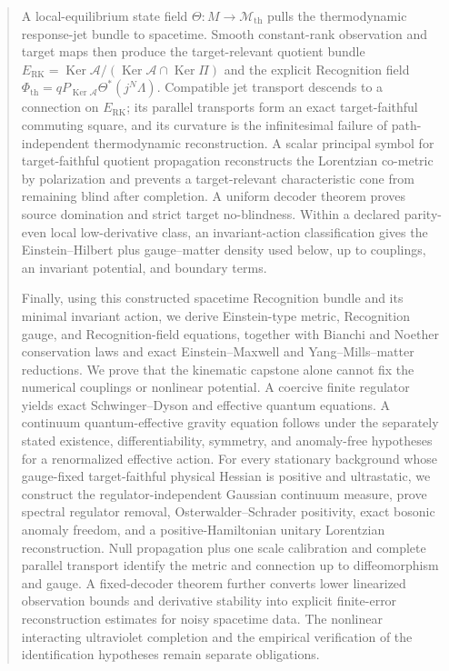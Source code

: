 \documentclass[11pt]{article}
\newcommand{\Ker}{\operatorname{Ker}}
\newcommand{\RK}{\mathrm{RK}}
\newcommand{\cM}{\mathcal M}
\newcommand{\cA}{\mathcal A}
\begin{document}
\begin{abstract}
A local-equilibrium state field $\Theta:M\to\cM_{\mathrm{th}}$ pulls the thermodynamic response-jet bundle to spacetime.  Smooth constant-rank observation and target maps then produce the target-relevant quotient bundle $E_{\RK}=\Ker\cA/(\Ker\cA\cap\Ker\Pi)$ and the explicit Recognition field $\Phi_{\mathrm{th}}=qP_{\Ker\cA}\Theta^*(j^N\Lambda)$.  Compatible jet transport descends to a connection on $E_{\RK}$; its parallel transports form an exact target-faithful commuting square, and its curvature is the infinitesimal failure of path-independent thermodynamic reconstruction.  A scalar principal symbol for target-faithful quotient propagation reconstructs the Lorentzian co-metric by polarization and prevents a target-relevant characteristic cone from remaining blind after completion.  A uniform decoder theorem proves source domination and strict target no-blindness.  Within a declared parity-even local low-derivative class, an invariant-action classification gives the Einstein--Hilbert plus gauge--matter density used below, up to couplings, an invariant potential, and boundary terms.

Finally, using this constructed spacetime Recognition bundle and its minimal invariant action, we derive Einstein-type metric, Recognition gauge, and Recognition-field equations, together with Bianchi and Noether conservation laws and exact Einstein--Maxwell and Yang--Mills--matter reductions.  We prove that the kinematic capstone alone cannot fix the numerical couplings or nonlinear potential.  A coercive finite regulator yields exact Schwinger--Dyson and effective quantum equations.  A continuum quantum-effective gravity equation follows under the separately stated existence, differentiability, symmetry, and anomaly-free hypotheses for a renormalized effective action.  For every stationary background whose gauge-fixed target-faithful physical Hessian is positive and ultrastatic, we construct the regulator-independent Gaussian continuum measure, prove spectral regulator removal, Osterwalder--Schrader positivity, exact bosonic anomaly freedom, and a positive-Hamiltonian unitary Lorentzian reconstruction.  Null propagation plus one scale calibration and complete parallel transport identify the metric and connection up to diffeomorphism and gauge.  A fixed-decoder theorem further converts lower linearized observation bounds and derivative stability into explicit finite-error reconstruction estimates for noisy spacetime data.  The nonlinear interacting ultraviolet completion and the empirical verification of the identification hypotheses remain separate obligations.
\end{abstract}
\end{document}

